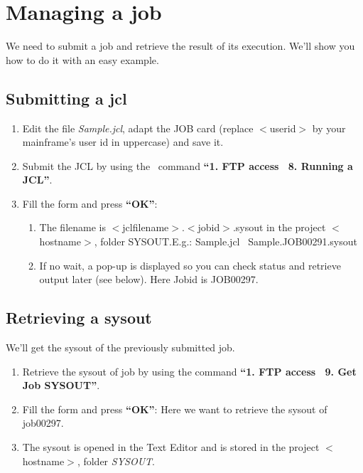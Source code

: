 \chapter{Managing a job}

We need to submit a job and retrieve the result of its execution. We'll show you how to do it with an easy example.

\section{Submitting a jcl}

\begin{enumerate}
\item Edit the file \textit{Sample.jcl}, adapt the JOB card (replace $<$userid$>$ by your mainframe's user id in uppercase) and save it.

\item Submit the JCL by using the \mxproduct~command \textbf{``1. FTP access \RHD~8. Running a JCL''}.

\item Fill the form and press \textbf{``OK''}:

	\begin{enumerate}
	\item The filename is $<$jclfilename$>$.$<$jobid$>$.sysout in the project $<$hostname$>$, folder SYSOUT.E.g.: Sample.jcl \pointer~Sample.JOB00291.sysout
	\item If no wait, a pop-up is displayed so you can check status and retrieve output later (see below).
	Here Jobid is JOB00297.
	\end{enumerate}

\end{enumerate}

\section{ Retrieving a sysout}

We'll get the sysout of the previously submitted job.
\begin{enumerate}
\item Retrieve the sysout of job by using the \mxproduct command \textbf{``1. FTP access \RHD~9. Get Job SYSOUT''}.

\item Fill the form and press \textbf{``OK''}:
Here we want to retrieve the sysout of job00297.

\item The sysout is opened in the Text Editor and is stored in the project $<$hostname$>$, folder \textit{SYSOUT}.

\end{enumerate}
